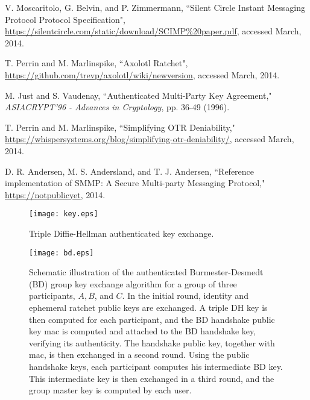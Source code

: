 \documentclass[%
preprint,
amsmath,amssymb,
aps,
prb,
floatfix,
]{revtex4-1}
\begin{document}
\begin{thebibliography}{99}
  V. Moscaritolo, G. Belvin, and P. Zimmermann,
``Silent Circle Instant Messaging Protocol Protocol Specification",
\url{https://silentcircle.com/static/download/SCIMP%20paper.pdf}, accessed 
March, 2014.

 T. Perrin and M. Marlinspike, ``Axolotl Ratchet",
\url{https://github.com/trevp/axolotl/wiki/newversion}, accessed March, 2014.

 M. Just and S. Vaudenay, ``Authenticated Multi-Party
Key Agreement," \textit{ASIACRYPT'96 - Advances in Cryptology}, pp. 36-49
(1996).

 T. Perrin and M. Marlinspike, ``Simplifying OTR
Deniability,"
\url{https://whispersystems.org/blog/simplifying-otr-deniability/}, accessed
March, 2014.

 D. R. Andersen, M. S. Andersland, and T.
J. Andersen, ``Reference implementation of SMMP: A Secure Multi-party Messaging
Protocol," \url{https://notpublicyet}, 2014.

\end{thebibliography}

\newpage
\begin{figure}[htb]
\centerline{\texttt{[image: key.eps]}}
\caption{Triple Diffie-Hellman authenticated key exchange.}
\label{fig:exchange}
\end{figure}

\newpage
\begin{figure}[htb]
\centerline{\texttt{[image: bd.eps]}}
\caption{
Schematic illustration of the authenticated Burmester-Desmedt (BD) group key exchange
algorithm for a group of three participants, $A, B$, and $C$.
In the initial round, identity and ephemeral ratchet public keys are exchanged.
A triple DH key is then computed for each participant, and the BD handshake
public key mac is computed and attached to the BD handshake key, verifying its
authenticity.  The handshake public key, together with mac, is then exchanged in
a second round.
Using the public handshake keys, each participant computes his intermediate BD
key. This intermediate key is then exchanged in a third round, and the group
master key is computed by each user.}
\label{fig:bd}
\end{figure}
\end{document}
